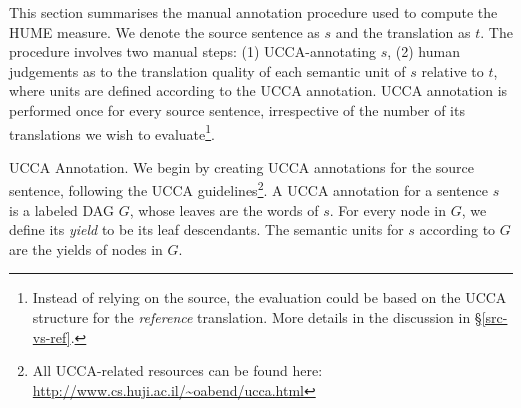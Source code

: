 \documentclass[11pt,letterpaper]{article}
\makeatletter
\renewcommand{\paragraph}{
  \@startsection{paragraph}{4}
  {\z@}{.3ex \@plus .3ex \@minus .2ex}{-1em}
  {\normalfont\normalsize\bfseries}
}
\newcommand{\secref}[1]{\S\ref{#1}}
\makeatother
\begin{document}
This section summarises the manual annotation procedure used
to compute the HUME measure. 
We denote the source sentence as $s$ and the translation as $t$. 
The procedure involves two manual steps: (1) UCCA-annotating $s$, 
(2) human judgements as to the translation quality of each semantic unit of $s$ relative to $t$,
where units are defined according to the UCCA annotation.
UCCA annotation is performed once for every source sentence,
irrespective of the number of its translations we wish
to evaluate\footnote{Instead of relying on the source,
the evaluation could be based on the UCCA structure for the \emph{reference}
translation.
More details in the discussion in \secref{src-vs-ref}.
}.

\paragraph{UCCA Annotation.}
We begin by creating UCCA annotations for the source sentence, following the
UCCA guidelines\footnote{All UCCA-related resources can be found
  here: \url{http://www.cs.huji.ac.il/~oabend/ucca.html}}.
A UCCA annotation for a sentence $s$ is a labeled DAG $G$, whose leaves
are the words of $s$.
For every node in $G$, we define its {\it yield} to be its leaf descendants.
The semantic units for $s$ according to $G$ are the yields of nodes in $G$. 

\end{document}
